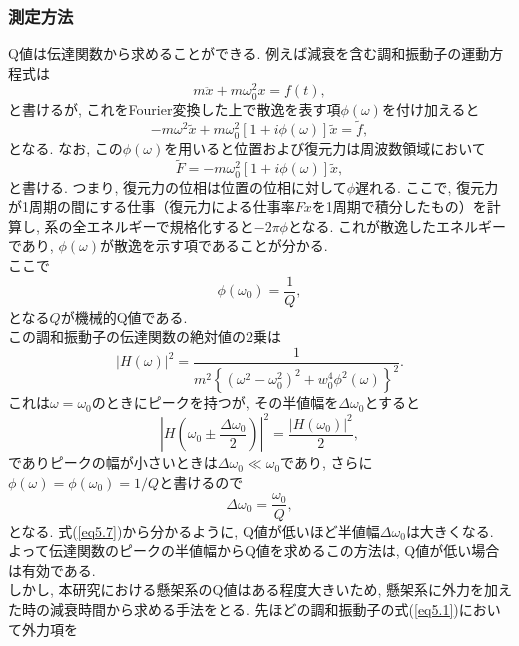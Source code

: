 \subsubsection{測定方法}
\vskip3mm
Q値は伝達関数から求めることができる. 例えば減衰を含む調和振動子の運動方程式は
\begin{equation}
m\ddot{x}+m\omega_0^2x=f(t),
\label{eq5.1}
\end{equation}
と書けるが, これをFourier変換した上で散逸を表す項$\phi(\omega)$を付け加えると
\begin{equation}
-m\omega^2\tilde{x}+m\omega_0^2\left[1+i\phi(\omega)\right]\tilde{x}=\tilde{f},
\end{equation}
となる. なお, この$\phi(\omega)$を用いると位置および復元力は周波数領域において
\begin{equation}
\tilde{F}=-m\omega_0^2\left[1+i\phi(\omega)\right]\tilde{x},
\end{equation}
と書ける. つまり, 復元力の位相は位置の位相に対して$\phi$遅れる. ここで, 復元力が1周期の間にする仕事（復元力による仕事率$F\dot{x}$を1周期で積分したもの）を計算し, 系の全エネルギーで規格化すると$-2\pi\phi$となる. これが散逸したエネルギーであり, $\phi(\omega)$が散逸を示す項であることが分かる. \\
\quad ここで
\begin{equation}
\phi(\omega_0)=\frac{1}{Q},
\end{equation}
となる$Q$が機械的Q値である.\\
\quad この調和振動子の伝達関数の絶対値の2乗は
\begin{equation}
\left|H(\omega)\right|^2=\frac{1}{m^2\left\{(\omega^2-\omega_0^2)^2+w_0^4\phi^2(\omega)\right\}^2}.
\end{equation}
これは$\omega=\omega_0$のときにピークを持つが, その半値幅を$\Delta\omega_0$とすると
\begin{equation}
\left|H\left(\omega_0\pm\frac{\Delta\omega_0}{2}\right)\right|^2=\frac{\left|H(\omega_0)\right|^2}{2},
\end{equation}
でありピークの幅が小さいときは$\Delta\omega_0\ll\omega_0$であり, さらに$\phi(\omega)=\phi(\omega_0)=1/Q$と書けるので
\begin{equation}
\Delta\omega_0=\frac{\omega_0}{Q},
\label{eq5.7}
\end{equation}
となる. 式(\ref{eq5.7})から分かるように, Q値が低いほど半値幅$\Delta\omega_0$は大きくなる. よって伝達関数のピークの半値幅からQ値を求めるこの方法は, Q値が低い場合は有効である. \\
\quad しかし, 本研究における懸架系のQ値はある程度大きいため, 懸架系に外力を加えた時の減衰時間から求める手法をとる. 先ほどの調和振動子の式(\ref{eq5.1})において外力項を
